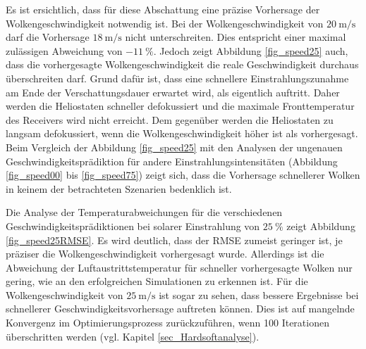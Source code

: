 Es ist ersichtlich, dass für diese Abschattung eine präzise Vorhersage der Wolkengeschwindigkeit notwendig ist.
Bei der Wolkengeschwindigkeit von $\SI{20}{\metre\per\second}$ darf die Vorhersage $\SI{18}{\metre\per\second}$ nicht unterschreiten.
Dies entspricht einer maximal zulässigen Abweichung von $\SI{-11}{\percent}$.
Jedoch zeigt Abbildung \ref{fig_speed25} auch, dass die vorhergesagte Wolkengeschwindigkeit die reale Geschwindigkeit durchaus überschreiten darf.
Grund dafür ist, dass eine schnellere Einstrahlungszunahme am Ende der Verschattungsdauer erwartet wird, als eigentlich auftritt.
Daher werden die Heliostaten schneller defokussiert und die maximale Fronttemperatur des Receivers wird nicht erreicht.
Dem gegenüber werden die Heliostaten zu langsam defokussiert, wenn die Wolkengeschwindigkeit höher ist als vorhergesagt.
Beim Vergleich der Abbildung \ref{fig_speed25} mit den Analysen der ungenauen Geschwindigkeitsprädiktion für andere Einstrahlungsintensitäten (Abbildung \ref{fig_speed00} bis \ref{fig_speed75}) zeigt sich, dass die Vorhersage schnellerer Wolken in keinem der betrachteten Szenarien bedenklich ist.

Die Analyse der Temperaturabweichungen für die verschiedenen Geschwindigkeitsprädiktionen bei solarer Einstrahlung von $\SI{25}{\percent}$ zeigt Abbildung \ref{fig_speed25RMSE}.
Es wird deutlich, dass der RMSE zumeist geringer ist, je präziser die Wolkengeschwindigkeit vorhergesagt wurde.
Allerdings ist die Abweichung der Luftaustrittstemperatur für schneller vorhergesagte Wolken nur gering, wie an den erfolgreichen Simulationen zu erkennen ist.
Für die Wolkengeschwindigkeit von $\SI{25}{\metre\per\second}$ ist sogar zu sehen, dass bessere Ergebnisse bei schnellerer Geschwindigkeitsvorhersage auftreten können.
Dies ist auf mangelnde Konvergenz im Optimierungsprozess zurückzuführen, wenn 100 Iterationen überschritten werden (vgl. Kapitel \ref{sec_Hardsoftanalyse}).

